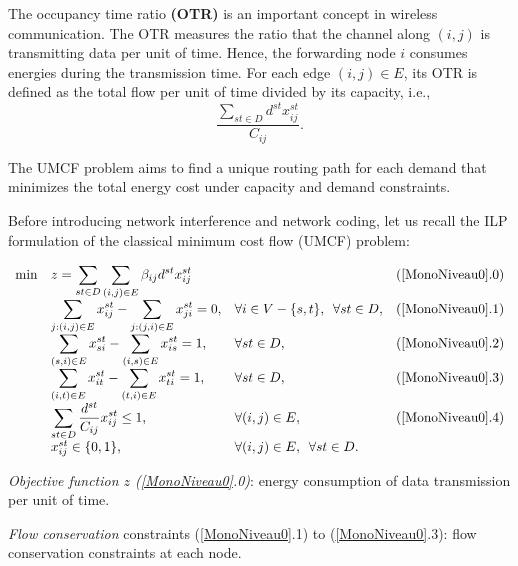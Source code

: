 The occupancy time ratio \textbf{(OTR)} is an important concept in wireless communication. The OTR measures the ratio that the channel along $(i,j)$ is transmitting data per unit of time. Hence, the forwarding node $i$ consumes energies during the transmission time. For each edge $(i,j ) \in E$, its OTR is defined as the total flow per unit of time divided by its capacity, i.e.,
\begin{equation}
    \frac{\sum_{st \in D} d^{st} x^{st}_{ij}}{C_{ij}}.
\end{equation}

The UMCF problem aims to find a unique routing path for each demand that minimizes the total energy cost under capacity and demand constraints.

Before introducing network interference and network coding, let us recall the ILP formulation of the classical minimum cost flow (UMCF) problem:

\begin{equation}\label{MonoNiveau0}
\begin{array}{llll}
\min & z =  \displaystyle \sum_{st \in D} \displaystyle \sum_{(i,j) \in E} \beta_{ij} d^{st} x^{st}_{ij}          &&  (\ref{MonoNiveau0}.0)\\
& \displaystyle \sum_{j:(i,j) \in E} x^{st}_{ij}-\displaystyle \sum_{j:(j,i) \in E} x^{st}_{ji} = 0, & \forall i \in V - \{s,t\},\enspace \forall st \in D, & (\ref{MonoNiveau0}.1)\\
& \displaystyle \sum_{(s, i) \in E} x^{st}_{si} - \displaystyle \sum_{(i, s) \in E} x^{st}_{is}   = 1, & \forall st \in D, & (\ref{MonoNiveau0}.2)\\
& \displaystyle \sum_{(i, t) \in E} x^{st}_{it}  - \displaystyle \sum_{(t, i) \in E} x^{st}_{ti}   = 1, & \forall st \in D, & (\ref{MonoNiveau0}.3)\\
& \displaystyle \sum_{st \in D}  \frac{d^{st}}{C_{ij}}x^{st}_{ij}   \leq 1,  & \forall (i,j) \in E,  & (\ref{MonoNiveau0}.4)\\
& x^{st}_{ij} \in \{0,1\}, &\forall (i,j) \in E, \enspace \forall st \in D.&\\

\end{array}
\end{equation}

\textit{Objective function \(z\) (\ref{MonoNiveau0}.0)}: energy consumption of data transmission per unit of time.

\textit{Flow conservation} constraints (\ref{MonoNiveau0}.1) to (\ref{MonoNiveau0}.3): flow conservation constraints at each node.

